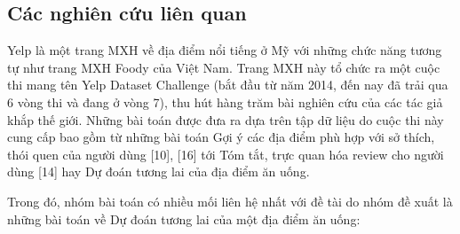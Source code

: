 \documentclass[12pt]{extarticle}
\begin{document}
		\subsection{Các nghiên cứu liên quan}
			\par Yelp là một trang MXH về địa điểm nổi tiếng ở Mỹ với những chức năng tương tự như trang MXH Foody của Việt Nam. Trang MXH này tổ chức ra một cuộc thi mang tên Yelp Dataset Challenge (bắt đầu từ năm 2014, đến nay đã trải qua 6 vòng thi và đang ở vòng 7), thu hút hàng trăm bài nghiên cứu của các tác giả khắp thế giới. Những bài toán được đưa ra dựa trên tập dữ liệu do cuộc thi này cung cấp bao gồm từ những bài toán Gợi ý các địa điểm phù hợp với sở thích, thói quen của người dùng [10], [16] tới Tóm tắt, trực quan hóa review cho người dùng [14] hay Dự đoán tương lai của địa điểm ăn uống.
			\par Trong đó, nhóm bài toán có nhiều mối liên hệ nhất với đề tài do nhóm đề xuất là những bài toán về Dự đoán tương lai của một địa điểm ăn uống:
\end{document}
